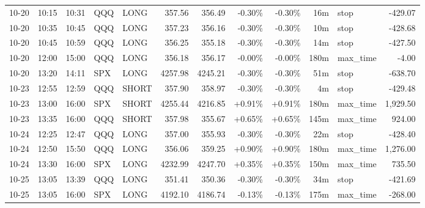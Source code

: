 \documentclass[11pt,a4paper]{article}
\begin{document}
\begin{center}
\begin{longtable}{>{\color{txtmain}}l l l l l r r r r r >{\color{txtmain}}l r}
10-20 & 10:15 & 10:31 & QQQ & LONG & 357.56 & 356.49 & \textcolor{lossred}{-0.30\%} & \textcolor{lossred}{-0.30\%} & 16m & stop & \textcolor{lossred}{-429.07} \\
10-20 & 10:35 & 10:45 & QQQ & LONG & 357.23 & 356.16 & \textcolor{lossred}{-0.30\%} & \textcolor{lossred}{-0.30\%} & 10m & stop & \textcolor{lossred}{-428.68} \\
10-20 & 10:45 & 10:59 & QQQ & LONG & 356.25 & 355.18 & \textcolor{lossred}{-0.30\%} & \textcolor{lossred}{-0.30\%} & 14m & stop & \textcolor{lossred}{-427.50} \\
10-20 & 12:00 & 15:00 & QQQ & LONG & 356.18 & 356.17 & \textcolor{lossred}{-0.00\%} & \textcolor{lossred}{-0.00\%} & 180m & max\_time & \textcolor{lossred}{-4.00} \\
10-20 & 13:20 & 14:11 & SPX & LONG & 4257.98 & 4245.21 & \textcolor{lossred}{-0.30\%} & \textcolor{lossred}{-0.30\%} & 51m & stop & \textcolor{lossred}{-638.70} \\
10-23 & 12:55 & 12:59 & QQQ & SHORT & 357.90 & 358.97 & \textcolor{lossred}{-0.30\%} & \textcolor{lossred}{-0.30\%} & 4m & stop & \textcolor{lossred}{-429.48} \\
10-23 & 13:00 & 16:00 & SPX & SHORT & 4255.44 & 4216.85 & \textcolor{wingreen}{+0.91\%} & \textcolor{wingreen}{+0.91\%} & 180m & max\_time & \textcolor{wingreen}{1,929.50} \\
10-23 & 13:35 & 16:00 & QQQ & SHORT & 357.98 & 355.67 & \textcolor{wingreen}{+0.65\%} & \textcolor{wingreen}{+0.65\%} & 145m & max\_time & \textcolor{wingreen}{924.00} \\
10-24 & 12:25 & 12:47 & QQQ & LONG & 357.00 & 355.93 & \textcolor{lossred}{-0.30\%} & \textcolor{lossred}{-0.30\%} & 22m & stop & \textcolor{lossred}{-428.40} \\
10-24 & 12:50 & 15:50 & QQQ & LONG & 356.06 & 359.25 & \textcolor{wingreen}{+0.90\%} & \textcolor{wingreen}{+0.90\%} & 180m & max\_time & \textcolor{wingreen}{1,276.00} \\
10-24 & 13:30 & 16:00 & SPX & LONG & 4232.99 & 4247.70 & \textcolor{wingreen}{+0.35\%} & \textcolor{wingreen}{+0.35\%} & 150m & max\_time & \textcolor{wingreen}{735.50} \\
10-25 & 13:05 & 13:39 & QQQ & LONG & 351.41 & 350.36 & \textcolor{lossred}{-0.30\%} & \textcolor{lossred}{-0.30\%} & 34m & stop & \textcolor{lossred}{-421.69} \\
10-25 & 13:05 & 16:00 & SPX & LONG & 4192.10 & 4186.74 & \textcolor{lossred}{-0.13\%} & \textcolor{lossred}{-0.13\%} & 175m & max\_time & \textcolor{lossred}{-268.00} \\

\end{longtable}
\end{center}
\end{document}
